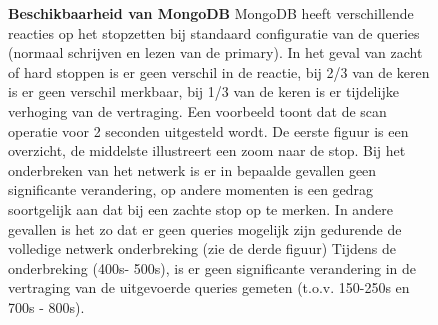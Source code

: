  
\begin{figure}[ht!] 
	\centering
	\caption{\textbf{Beschikbaarheid van MongoDB} \newline
	MongoDB heeft verschillende reacties op het stopzetten bij standaard configuratie van de queries (normaal schrijven en lezen van de primary). In het geval van zacht of hard stoppen is er geen verschil in de reactie, bij 2/3 van de keren is er geen verschil merkbaar, bij 1/3 van de keren is er tijdelijke verhoging van de vertraging. Een voorbeeld toont dat de scan operatie voor 2 seconden uitgesteld wordt. De eerste figuur is een overzicht, de middelste illustreert een zoom naar de stop.\newline
	Bij het onderbreken van het netwerk is er in bepaalde gevallen geen significante verandering, op andere momenten is een gedrag soortgelijk aan dat bij een zachte stop op te merken. In andere gevallen is het zo dat er geen queries mogelijk zijn gedurende de volledige netwerk onderbreking (zie de derde figuur) \newline
	Tijdens de onderbreking (400s- 500s), is er geen significante verandering in de vertraging van de uitgevoerde queries gemeten (t.o.v. 150-250s en 700s - 800s). \newline
	 }
	\label{fig:beschikbaar-mongodb-1}
\end{figure}

